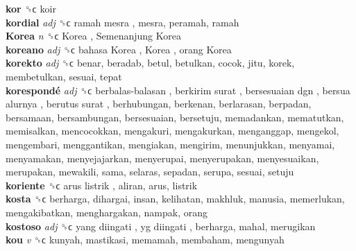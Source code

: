 \textbf{kor} ␝ϲ  koir  \\
\textbf{kordial} \emph{adj}  ␝ϲ   ramah mesra , mesra, peramah, ramah  \\
\textbf{Korea} \emph{n}  ␝ϲ   Korea ,  Semenanjung Korea   \\
\textbf{koreano} \emph{adj}  ␝ϲ   bahasa Korea ,  Korea ,  orang Korea   \\
\textbf{korekto} \emph{adj}  ␝ϲ  benar, beradab, betul, betulkan, cocok, jitu, korek, membetulkan, sesuai, tepat  \\
\textbf{korespondé} \emph{adj}  ␝ϲ   berbalas-balasan ,  berkirim surat ,  bersesuaian dgn ,  bersua alurnya ,  berutus surat , berhubungan, berkenan, berlarasan, berpadan, bersamaan, bersambungan, bersesuaian, bersetuju, memadankan, mematutkan, memisalkan, mencocokkan, mengakuri, mengakurkan, menganggap, mengekol, mengembari, menggantikan, mengiakan, mengirim, menunjukkan, menyamai, menyamakan, menyejajarkan, menyerupai, menyerupakan, menyesuaikan, merupakan, mewakili, sama, selaras, sepadan, serupa, sesuai, setuju  \\
\textbf{koriente} ␝ϲ   arus listrik , aliran, arus, listrik  \\
\textbf{kosta} ␝ϲ  berharga, dihargai, insan, kelihatan, makhluk, manusia, memerlukan, mengakibatkan, menghargakan, nampak, orang  \\
\textbf{kostoso} \emph{adj}  ␝ϲ   yang diingati ,  yg diingati , berharga, mahal, merugikan  \\
\textbf{kou} \emph{v}  ␝ϲ  kunyah, mastikasi, memamah, membaham, mengunyah  \\
